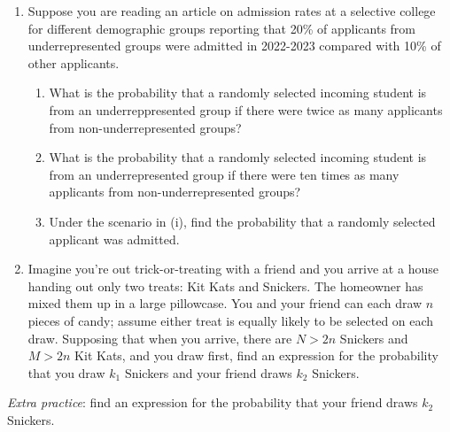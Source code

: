 \documentclass[
  letterpaper,
  DIV=11,
  numbers=noendperiod]{scrartcl}
\providecommand{\tightlist}{%
  \setlength{\itemsep}{0pt}\setlength{\parskip}{0pt}}\usepackage{longtable,booktabs,array}
\begin{document}
\begin{enumerate}
\def\labelenumi{\arabic{enumi}.}
\setcounter{enumi}{1}
\item
  Suppose you are reading an article on admission rates at a selective
  college for different demographic groups reporting that 20\% of
  applicants from underrepresented groups were admitted in 2022-2023
  compared with 10\% of other applicants.

  \begin{enumerate}
  \def\labelenumii{\roman{enumii}.}
  \tightlist
  \item
    What is the probability that a randomly selected incoming student is
    from an underreppresented group if there were twice as many
    applicants from non-underrepresented groups?
  \item
    What is the probability that a randomly selected incoming student is
    from an underrepresented group if there were ten times as many
    applicants from non-underrepresented groups?
  \item
    Under the scenario in (i), find the probability that a randomly
    selected applicant was admitted.
  \end{enumerate}
\item
  Imagine you're out trick-or-treating with a friend and you arrive at a
  house handing out only two treats: Kit Kats and Snickers. The
  homeowner has mixed them up in a large pillowcase. You and your friend
  can each draw \(n\) pieces of candy; assume either treat is equally
  likely to be selected on each draw. Supposing that when you arrive,
  there are \(N > 2n\) Snickers and \(M > 2n\) Kit Kats, and you draw
  first, find an expression for the probability that you draw \(k_1\)
  Snickers and your friend draws \(k_2\) Snickers.
\end{enumerate}

\emph{Extra practice}: find an expression for the probability that your
friend draws \(k_2\) Snickers.
\end{document}
